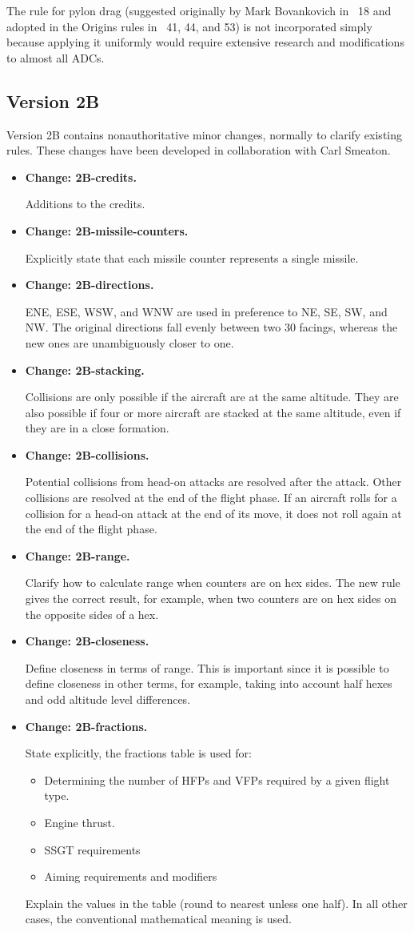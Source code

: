 \documentclass[10pt]{report}
\newcommand{\itemtag}[1]{\item \textbf{Change: #1.}\par}
\begin{document}
The rule for pylon drag (suggested originally by Mark Bovankovich in {\APJ}~18 and adopted in the Origins rules in {\APJ}~41, 44, and 53) is not incorporated simply because applying it uniformly would require extensive research and modifications to almost all ADCs.

\subsection{Version 2B}

Version 2B contains nonauthoritative minor changes, normally to clarify existing rules. These changes have been developed in collaboration with Carl Smeaton.

\begin{itemize}
    \itemtag{2B-credits} Additions to the credits.
    
    \itemtag{2B-missile-counters} Explicitly state that each missile counter represents a single missile.

    \itemtag{2B-directions} ENE, ESE, WSW, and WNW are used in preference to NE, SE, SW, and NW. The original directions fall evenly between two 30{\deg} facings, whereas the new  ones are unambiguously closer to one.

    \itemtag{2B-stacking} Collisions are only possible if the aircraft are at the same altitude. They are also possible if four or more aircraft are stacked at the same altitude, even if they are in a close formation.

    \itemtag{2B-collisions} Potential collisions from head-on attacks are resolved after the attack. Other collisions are resolved at the end of the flight phase. If an aircraft rolls for a collision for a head-on attack at the end of its move, it does not roll again at the end of the flight phase.

    \itemtag{2B-range} Clarify how to calculate range when counters are on hex sides. The new rule gives the correct result, for example, when two counters are on hex sides on the opposite sides of a hex.
    
    \itemtag{2B-closeness} Define closeness in terms of range. This is important since it is possible to define closeness in other terms, for example, taking into account half hexes and odd altitude level differences.

    \itemtag{2B-fractions} State explicitly, the fractions table is used for:
    \begin{itemize}
        \item Determining the number of HFPs and VFPs required by a given flight type.
        \item Engine thrust.
        \item SSGT requirements
        \item Aiming requirements and modifiers
    \end{itemize}
    Explain the values in the table (round to nearest unless one half). In all other cases, the conventional mathematical meaning is used.


\end{itemize}
\end{document}
